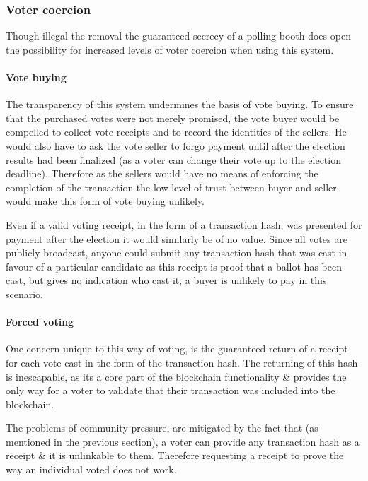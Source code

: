 \documentclass{article}
\begin{document}
    \subsubsection{Voter coercion}
    Though illegal the removal the guaranteed secrecy of a polling booth does open the possibility for increased levels of voter coercion when using this system.    
    
	\paragraph{Vote buying}
	\hfill \break \break
	The transparency of this system undermines the basis of vote buying. To ensure that the purchased votes were not merely promised, the vote buyer would be compelled to collect vote receipts and to record the identities of the sellers. He would also have to ask the vote seller to forgo payment until after the election results had been finalized (as a voter can change their vote up to the election deadline). Therefore as the sellers would have no means of enforcing the completion of the transaction the low level of trust between buyer and seller would make this form of vote buying unlikely.

	Even if a valid voting receipt, in the form of a transaction hash, was presented for payment after the election it would similarly be of no value. Since all votes are publicly broadcast, anyone could submit any transaction hash that was cast in favour of a particular candidate as this receipt is proof that a ballot has been cast, but gives no indication who cast it, a buyer is unlikely to pay in this scenario.

	\cleardoublepage
	\paragraph{Forced voting}
	\hfill \break \break
	One concern unique to this way of voting, is the guaranteed return of a receipt for each vote cast in the form of the transaction hash. The returning of this hash is inescapable, as its a core part of the blockchain functionality \& provides the only way for a voter to validate that their transaction was included into the blockchain. 
	
	The problems of community pressure, are mitigated by the fact that (as mentioned in the previous section), a voter can provide any transaction hash as a receipt \& it is unlinkable to them. Therefore requesting a receipt to prove the way an individual voted does not work.
	
\end{document}
